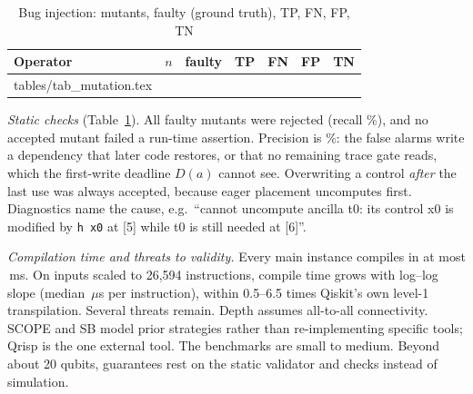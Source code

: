 \documentclass[conference,a4paper]{IEEEtran}
\makeatletter
\newcommand{\inputtable}[1]{\@@input #1 }
\makeatother
\begin{document}
\begin{table}[t]
\caption{Bug injection: mutants, faulty (ground truth), TP, FN, FP, TN}
\label{tab:mutation}
\centering
\scriptsize
\setlength{\tabcolsep}{3pt}
\begin{tabular}{@{}lrrrrrr@{}}
\toprule
Operator & $n$ & faulty & TP & FN & FP & TN \\
\midrule
\inputtable{tables/tab_mutation.tex}
\bottomrule
\end{tabular}
\end{table}

\emph{Static checks} (Table~\ref{tab:mutation}). All \MutFaulty{} faulty mutants were rejected (recall \MutRecall\%), and no accepted mutant failed a run-time assertion. Precision is \MutPrecision\%: the \MutFP{} false alarms write a dependency that later code restores, or that no remaining trace gate reads, which the first-write deadline $D(a)$ cannot see. Overwriting a control \emph{after} the last use was always accepted, because eager placement uncomputes first. Diagnostics name the cause, e.g.\ ``cannot uncompute ancilla t0: its control x0 is modified by \texttt{h x0} at [5] while t0 is still needed at [6]''.

\emph{Compilation time and threats to validity.} Every main instance compiles in at most \MaxCompileMs\,ms. On inputs scaled to 26{,}594 instructions, compile time grows with log--log slope \Slope{} (median \UsPerInstr\,$\mu$s per instruction), within 0.5--6.5 times Qiskit's own level-1 transpilation. Several threats remain. Depth assumes all-to-all connectivity. SCOPE and SB model prior strategies rather than re-implementing specific tools; Qrisp is the one external tool. The benchmarks are small to medium. Beyond about 20 qubits, guarantees rest on the static validator and checks instead of simulation.

\end{document}
